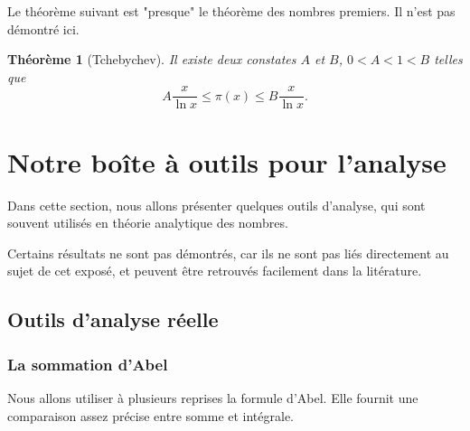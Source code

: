 \documentclass[french]{report}
\newtheorem{theorem}{Théorème}[section]
\begin{document}
Le théorème suivant est "presque" le théorème des nombres premiers. Il n'est pas démontré ici.

\begin{theorem}[Tchebychev]
  Il existe deux constates $A$ et $B$, $0<A<1<B$ telles que
  \[
    A\frac{x}{\ln x}\leq\pi(x)\leq B\frac{x}{\ln x}.
  \]
\end{theorem}

\chapter{Notre boîte à outils pour l'analyse}

Dans cette section, nous allons présenter quelques outils d'analyse, qui sont souvent utilisés en théorie analytique des nombres.

Certains résultats ne sont pas démontrés, car ils ne sont pas liés directement au sujet de cet exposé, et peuvent être retrouvés facilement dans la litérature.

\section{Outils d'analyse réelle}

\subsection{La sommation d'Abel}

Nous allons utiliser à plusieurs reprises la formule d'Abel. Elle fournit une comparaison assez précise entre somme et intégrale.
\end{document}
